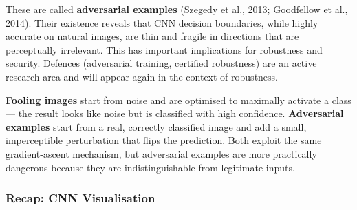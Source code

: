 \documentclass[11pt,a4paper]{article}
\newcommand{\term}[1]{\textcolor{DefGreen}{\textbf{#1}}\index{#1}}
\begin{document}
These are called \term{adversarial examples} (Szegedy et al., 2013; Goodfellow et al., 2014).  Their existence reveals that CNN decision boundaries, while highly accurate on natural images, are thin and fragile in directions that are perceptually irrelevant.  This has important implications for robustness and security.  Defences (adversarial training, certified robustness) are an active research area and will appear again in the context of robustness.

\begin{warnbox}
\textbf{Fooling images} start from noise and are optimised to maximally activate a class — the result looks like noise but is classified with high confidence.  \textbf{Adversarial examples} start from a real, correctly classified image and add a small, imperceptible perturbation that flips the prediction.  Both exploit the same gradient-ascent mechanism, but adversarial examples are more practically dangerous because they are indistinguishable from legitimate inputs.
\end{warnbox}

\subsubsection{Recap: CNN Visualisation}
\end{document}
